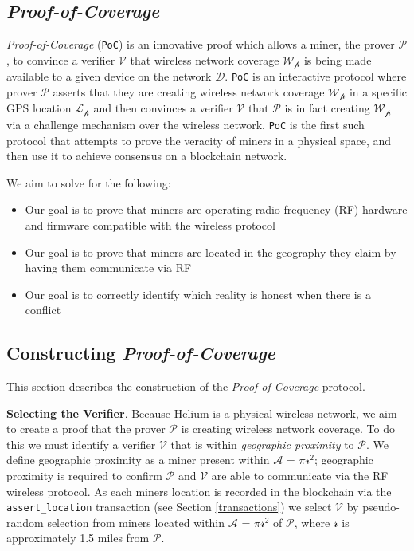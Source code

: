 \documentclass[letterpaper,11pt]{article}
\def\prover/{$\mathcal{P}$}
\def\verifier/{$\mathcal{V}$}
\def\coverage/{$\mathcal{W_p}$}
\def\device/{$\mathcal{D}$}
\def\location/{$\mathcal{L_p}$}
\def\proofofcoverage/{\textit{Proof-of-Coverage}}
\begin{document}
\subsection{\proofofcoverage/}

\proofofcoverage/ (\verb|PoC|) is an innovative proof which allows a miner, the prover \prover/, to convince a verifier \verifier/ that wireless network coverage \coverage/ is being made available to a given device on the network \device/. \verb|PoC| is an interactive protocol where prover \prover/ asserts that they are creating wireless network coverage \coverage/ in a specific GPS location \location/ and then convinces a verifier \verifier/ that \prover/ is in fact creating \coverage/ via a challenge mechanism over the wireless network. \verb|PoC| is the first such protocol that attempts to prove the veracity of miners in a physical space, and then use it to achieve consensus on a blockchain network.\newline

We aim to solve for the following:

\begin{itemize}
	\item Our goal is to prove that miners are operating radio frequency (RF) hardware and firmware compatible with the wireless protocol	
	\item Our goal is to prove that miners are located in the geography they claim by having them communicate via RF
	\item Our goal is to correctly identify which reality is honest when there is a conflict
\end{itemize}

\subsection{Constructing \proofofcoverage/}

This section describes the construction of the \proofofcoverage/ protocol.\newline

\textbf{Selecting the Verifier}. Because Helium is a physical wireless network, we aim to create a proof that the prover \prover/ is creating wireless network coverage. To do this we must identify a verifier \verifier/ that is within \textit{geographic proximity} to \prover/. We define geographic proximity as a miner present within $\mathcal{A}$ = $\mathcal{\pi}$$\mathcal{r^2}$; geographic proximity is required to confirm \prover/ and \verifier/ are able to communicate via the RF wireless protocol. As each miners location is recorded in the blockchain via the \verb|assert_location| transaction (see Section \ref{transactions}) we select \verifier/ by pseudo-random selection from miners located within $\mathcal{A}$ = $\mathcal{\pi}$$\mathcal{r^2}$ of \prover/, where $\mathcal{r}$ is approximately 1.5 miles from \prover/.\newline
\end{document}
